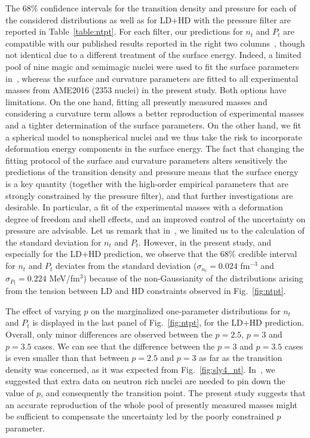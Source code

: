 The $68\%$ confidence intervals for 
the transition density and pressure for each of the considered distributions 
{as well as for LD+HD with the pressure filter} are reported in 
Table~\ref{table:ntpt}. 
{For each filter, our predictions for $n_t$ and $P_t$ are compatible with 
our published results reported in the right two 
columns~\cite{Carreau2019cc}, though not identical due to 
a different treatment of the surface energy. Indeed, a limited pool of nine 
magic and semimagic nuclei were used to fit the surface parameters
in~\cite{Carreau2019cc}, whereas the surface and curvature parameters are
fitted to all experimental masses from AME2016 (2353 nuclei) in the present 
study. Both options have limitations. On the one hand, fitting all presently
measured masses and considering a curvature term allows a better reproduction
of experimental masses and a tighter determination of the surface parameters.
On the other hand, we fit a spherical model to nonspherical nuclei and we thus
take the risk to incorporate deformation energy components in the surface 
energy.
The fact that changing the fitting protocol of the surface and curvature
parameters alters sensitively the predictions of the transition density and
pressure means that the surface energy is a key quantity (together with the
high-order empirical parameters that are strongly constrained by the pressure 
filter), and that further investigations are desirable. In particular, a fit of 
the experimental masses with a deformation degree of freedom and shell effects, 
and an improved control of the uncertainty on pressure are advisable.
Let us remark that in~\cite{Carreau2019cc}, we limited us to the calculation of 
the standard deviation for $n_t$ and $P_t$.
However, in the present study, and especially for the LD+HD prediction, 
we observe that the $68\%$ credible interval for $n_t$ and $P_t$ deviates from 
the standard deviation ($\sigma_{n_t} = 0.024$ fm$^{-3}$ and $\sigma_{P_t} = 
0.224$ MeV/fm$^3$) because of the non-Gaussianity of the distributions arising 
from the tension between LD and HD constraints observed in Fig.~\ref{fig:ntpt}.
}

The effect of varying $p$ on the marginalized one-parameter distributions for
$n_t$ and $P_t$ is displayed in the last panel of Fig.~\ref{fig:ntpt}, for the
LD+HD prediction. Overall, only minor differences are observed between the 
$p=2.5$, $p=3$ and $p=3.5$ cases. We can see that the difference between the 
$p=3$ and $p=3.5$ cases is even smaller than that between 
$p=2.5$ and $p=3$ as far as the transition density was concerned, as it was 
expected from Fig.~\ref{fig:sly4_nt}. 
%
In~\cite{Carreau2019cc}, we suggested that extra data on neutron rich nuclei
are needed to pin down the value of $p$, and consequently the transition point.
The present study suggests that an accurate reproduction of the whole pool of
presently measured masses might be sufficient to compensate the uncertainty led
by the poorly constrained $p$ parameter.

